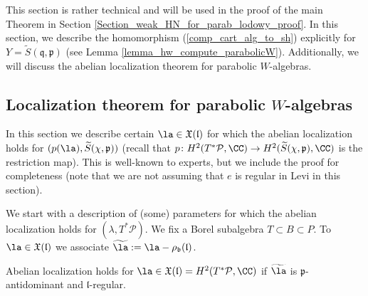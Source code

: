\documentclass[12pt]{amsart}
\begin{document}
This section is rather technical and will be used in the proof of the main Theorem in Section \ref{Section_weak_HN_for_parab_lodowy_proof}.
In this section, we describe the homomorphism (\ref{comp_cart_alg_to_sh}) explicitly for $Y=\widetilde{S}(\mathfrak{q},\mathfrak{p})$ (see Lemma \ref{lemma_hw_compute_parabolicW}). Additionally, we will discuss the abelian localization theorem for parabolic $W$-algebras.



\subsection{Localization theorem for parabolic $W$-algebras}\label{sec_loc_thm_parab_W}
In this section we describe certain $\la \in \mathfrak{X}(\mathfrak{l})$ for which the abelian localization holds for $(p(\la),\widetilde{S}(\chi,\mathfrak{p}))$ (recall that $p\colon H^2(T^*\mathcal{P},\CC) \rightarrow H^2(\widetilde{S}(\chi,\mathfrak{p}),\CC)$ is the restriction map). This is well-known to experts, but we include the proof for completeness (note that we are not assuming that $e$ is regular in Levi in this section).  



We start with a description of (some) parameters for which the abelian localization holds for $(\lambda,T^*\mathcal{P})$. We fix a Borel subalgebra $T \subset B \subset P$.
To $\la \in \mathfrak{X}(\mathfrak{l})$ we associate $\widetilde{\la}:=\la-\rho_{\mathfrak{b}}(\mathfrak{l})$.




	
 
	
 
	
	
	\begin{prop}\label{loc_flags} 
Abelian localization holds for $\la \in \mathfrak{X}(\mathfrak{l})=H^2(T^*\mathcal{P},\CC)$ if $\widetilde{\la}$ is 
$\mathfrak{p}$-antidominant and $\mathfrak{l}$-regular.
	\end{prop}
	
\end{document}
